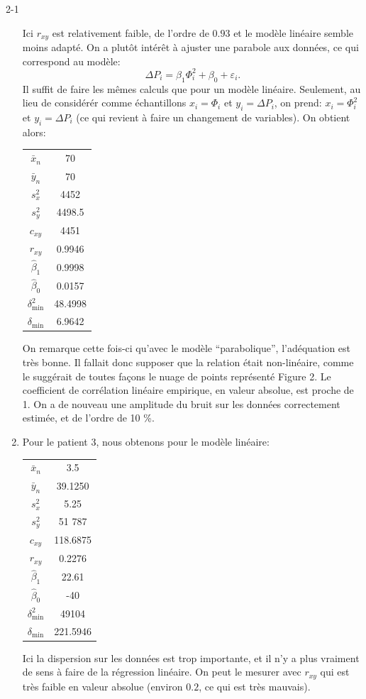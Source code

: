 \begin{corrige}{2-1}
\begin{enumerate}
Ici $r_{xy}$ est relativement faible, de l'ordre de $0.93$ et le modèle linéaire semble moins adapté. On a plutôt intérêt à ajuster une parabole aux données, ce qui correspond au modèle:
\[
\Delta P_i = \beta_1 \Phi^2_i + \beta_0 + \varepsilon_i.
\]
Il suffit de faire les mêmes calculs que pour un modèle linéaire. Seulement, au lieu de considérér comme échantillons $x_i = \Phi_i$ et $y_i = \Delta P_i$, on prend: $x_i = \Phi^2_i$ et $y_i = \Delta P_i$ (ce qui revient à faire un changement de variables).
On obtient alors:
\begin{center}
\begin{tabular}{|c|c|}\hline
    $\bar{x}_n$ & 70\\
    $\bar{y}_n$ & 70\\
    $s^2_x$ & 4452 \\
    $s^2_y$ & 4498.5 \\
    $c_{xy}$ & 4451\\ \hline
    $r_{xy}$ & 0.9946\\ \hline
    $\hat{\beta}_1$ & 0.9998\\
    $\hat{\beta}_0$ & 0.0157\\ \hline
    $\delta^2_{\mathrm{min}}$ & 48.4998\\
    $\delta_{\mathrm{min}}$ & 6.9642\\\hline
\end{tabular}
\end{center}    
On remarque cette fois-ci qu'avec le modèle ``parabolique'', l'adéquation est très bonne. Il fallait donc supposer que la relation était non-linéaire, comme le suggérait de toutes façons le nuage de points représenté Figure 2. Le coefficient de corrélation linéaire empirique, en valeur absolue, est proche de 1. On a de nouveau une amplitude du bruit sur les données correctement estimée, et de l'ordre de 10 \%.

\item Pour le patient 3, nous obtenons pour le modèle linéaire:
\begin{center}
\begin{tabular}{|c|c|}\hline
    $\bar{x}_n$ & 3.5\\
    $\bar{y}_n$ & 39.1250\\
    $s^2_x$ & 5.25 \\
    $s^2_y$ & 51 787 \\
    $c_{xy}$ & 118.6875\\ \hline
    $r_{xy}$ & 0.2276\\ \hline
    $\hat{\beta}_1$ & 22.61\\
    $\hat{\beta}_0$ & -40\\ \hline
    $\delta^2_{\mathrm{min}}$ & 49104\\
    $\delta_{\mathrm{min}}$ & 221.5946\\\hline
\end{tabular}
\end{center}    
Ici la dispersion sur les données est trop importante, et il n'y a plus vraiment de sens à faire de la régression linéaire. On peut le mesurer avec $r_{xy}$ qui est très faible en valeur absolue (environ $0.2$, ce qui est très mauvais).



\end{enumerate}
\end{corrige}
